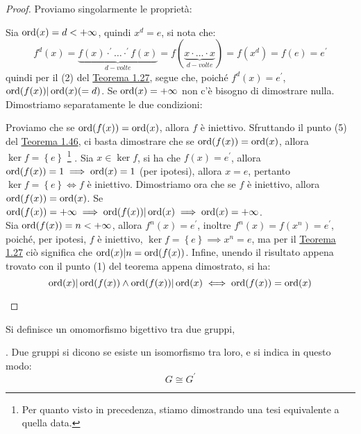 \documentclass[11pt]{scrartcl}
\begin{document}
\begin{proof}
Proviamo singolarmente le proprietà:
\begin{enumerate}[(1)]
	\ii Sia $\operatorname{ord} (x)=d < +\infty$, quindi $x^d=e$, si nota che:
		\[ f^d(x)
		=
		\underbrace{f(x) \cdot^{\prime} \ldots \cdot^{\prime}f(x)}_{d-volte}
		=
		f(\underbrace{x \cdot \ldots \cdot x}_{d-volte})
		=
		f(x^d)
		=
		f(e)
		=
		e^{\prime}
		\]
		quindi per il (2) del \hyperref[thm:g_due]{Teorema 1.27}, segue che, poiché $f^{d}(x)=e^{\prime}$, $\operatorname{ord}(f(x))|\operatorname{ord}(x) (= d)$. Se $\operatorname{ord}(x)=+\infty$ non c'è bisogno di dimostrare nulla.
	\ii Dimostriamo separatamente le due condizioni:
		\begin{enumerate}[(a)]
		\ii Proviamo che se $\operatorname{ord}(f(x))=\operatorname{ord}(x)$, allora $f$ è iniettivo. Sfruttando il punto (5) del \hyperref[thm:g_quattro]{Teorema 1.46}, ci basta dimostrare che se $\operatorname{ord}(f(x))=\operatorname{ord}(x)$,  allora $\ker f = \left\{e\right\}$ \footnote{Per quanto visto in precedenza, stiamo dimostrando una tesi equivalente a quella data.} . Sia $x \in \ker f$, si ha che $f(x)=e^{\prime}$, allora $\operatorname{ord}(f(x))=1 \implies \operatorname{ord}(x)=1$ (per ipotesi), allora $x=e$, pertanto $\ker f= \left\{e\right\} \iff f$ è iniettivo.
		\ii Dimostriamo ora che se $f$ è iniettivo, allora $\operatorname{ord}(f(x))=\operatorname{ord}(x)$. Se $\operatorname{ord}(f(x)) = +\infty \implies \operatorname{ord}(f(x))|\operatorname{ord}(x) \implies \operatorname{ord}(x)=+\infty$. \\
		Sia $\operatorname{ord}(f(x))=n<+\infty$, allora $f^{n}(x)=e^{\prime}$, inoltre $f^{n}(x)=f(x^{n})=e^{\prime}$, poiché, per ipotesi, $f$ è iniettivo, $\ker f=\left\{e\right\} \implies x^n=e$, ma per il \hyperref[thm:g_due]{Teorema 1.27} ciò significa che $\operatorname{ord}(x)|n=\operatorname{ord}(f(x))$. Infine, unendo il risultato appena trovato con il punto (1) del teorema appena dimostrato, si ha:
		\[ \operatorname{ord}(x)|\operatorname{ord}(f(x)) \land \operatorname{ord}(f(x))|\operatorname{ord}(x)
		\iff
		\operatorname{ord}(f(x))=\operatorname{ord}(x)
		\]
		\end{enumerate}
\end{enumerate}
\end{proof}

\begin{definition}
Si definisce  un omomorfismo bigettivo tra due gruppi, . Due gruppi si dicono  se esiste un isomorfismo tra loro, e si indica in questo modo:
	\[ G \cong G^{\prime}
	\]
\end{definition}
\end{document}
